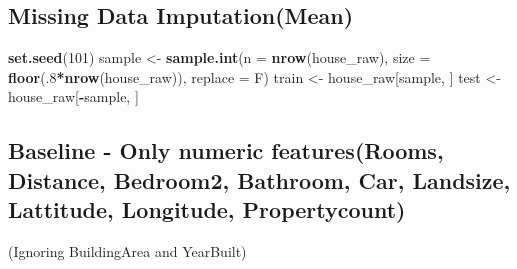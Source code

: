 \documentclass[]{article}
\newenvironment{Shaded}{\begin{snugshade}}{\end{snugshade}}
\newcommand{\DataTypeTok}[1]{\textcolor[rgb]{0.13,0.29,0.53}{#1}}
\newcommand{\DecValTok}[1]{\textcolor[rgb]{0.00,0.00,0.81}{#1}}
\newcommand{\KeywordTok}[1]{\textcolor[rgb]{0.13,0.29,0.53}{\textbf{#1}}}
\newcommand{\NormalTok}[1]{#1}
\newcommand{\OperatorTok}[1]{\textcolor[rgb]{0.81,0.36,0.00}{\textbf{#1}}}
\newcommand{\OtherTok}[1]{\textcolor[rgb]{0.56,0.35,0.01}{#1}}
\newcommand{\StringTok}[1]{\textcolor[rgb]{0.31,0.60,0.02}{#1}}
\begin{document}
\hypertarget{missing-data-imputationmean}{%
\subsection{Missing Data
Imputation(Mean)}\label{missing-data-imputationmean}}

\begin{Shaded}
\end{Shaded}

\begin{Shaded}
\begin{Highlighting}[]
\KeywordTok{set.seed}\NormalTok{(}\DecValTok{101}\NormalTok{) }
\NormalTok{sample <-}\StringTok{ }\KeywordTok{sample.int}\NormalTok{(}\DataTypeTok{n =} \KeywordTok{nrow}\NormalTok{(house_raw), }\DataTypeTok{size =} \KeywordTok{floor}\NormalTok{(.}\DecValTok{8}\OperatorTok{*}\KeywordTok{nrow}\NormalTok{(house_raw)), }\DataTypeTok{replace =}\NormalTok{ F)}
\NormalTok{train <-}\StringTok{ }\NormalTok{house_raw[sample, ]}
\NormalTok{test  <-}\StringTok{ }\NormalTok{house_raw[}\OperatorTok{-}\NormalTok{sample, ]}
\end{Highlighting}
\end{Shaded}

\hypertarget{baseline---only-numeric-featuresrooms-distance-bedroom2-bathroom-car-landsize-lattitude-longitude-propertycount}{%
\subsection{Baseline - Only numeric features(Rooms, Distance, Bedroom2,
Bathroom, Car, Landsize, Lattitude, Longitude,
Propertycount)}\label{baseline---only-numeric-featuresrooms-distance-bedroom2-bathroom-car-landsize-lattitude-longitude-propertycount}}

(Ignoring BuildingArea and YearBuilt)
\end{document}
